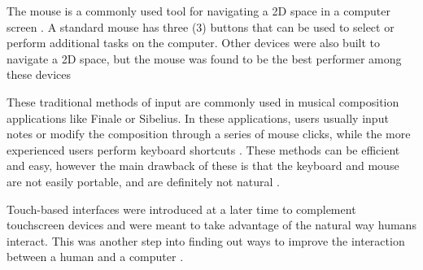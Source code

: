 
The mouse is a commonly used tool for navigating a 2D space in a computer screen \citep{engelbart1968a}. A standard mouse has three (3) buttons that can be used to select or perform additional tasks on the computer. Other devices were also built to navigate a 2D space, but the mouse was found to be the best performer among these devices \citep{karat1986a}


        
        	These traditional methods of input are commonly used in musical composition applications like Finale or Sibelius. In these applications, users usually input notes or modify the composition through a series of mouse clicks, while the more experienced users perform keyboard shortcuts \citep{knoder2017sibelius,knoder2017finale}. These methods can be efficient and easy, however the main drawback of these is that the keyboard and mouse are not easily portable, and are definitely not natural \citep{norman2010natural}.

		Touch-based interfaces were introduced at a later time to complement touchscreen devices and were meant to take advantage of the natural way humans interact. This was another step into finding out ways to improve the interaction between a human and a computer \citep{travis2014comparative}. 
       
